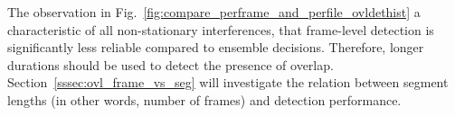 {The observation in Fig.~\ref{fig:compare_perframe_and_perfile_ovldethist} a characteristic of all non-stationary interferences, that frame-level detection is significantly less reliable compared to ensemble decisions. 
Therefore, longer durations should be used to detect the presence of overlap. 
Section~\ref{sssec:ovl_frame_vs_seg} will investigate the relation between segment lengths (in other words, number of frames) and detection performance. 


}
